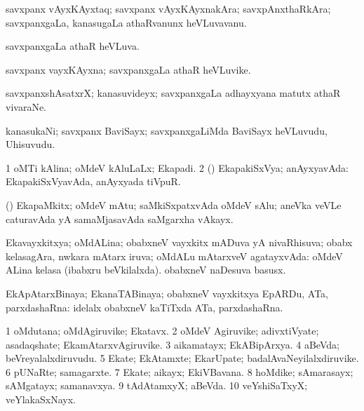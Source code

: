\bentry
{}
\gl{\gu}
\bmng
savxpanx vAyxKAyxtaq; savxpanx vAyxKAyxnakAra; savxpAnxthaRkAra; savxpanxgaLa, kanasugaLa athaRvanunx heVLuvavanu. 
\emng
\eentry

\bentry
{}
\gl{\gu}
\bmng
savxpanxgaLa athaR heVLuva. 
\emng
\eentry

\bentry
{}
\gl{\nA}
\bmng
savxpanx vayxKAyxna; savxpanxgaLa athaR heVLuvike. 
\emng
\eentry

\bentry
{}
\gl{\nA}
\bmng
savxpanxshAsatxrX; kanasuvideyx; savxpanxgaLa adhayxyana matutx athaR vivaraNe. 
\emng
\eentry

\bentry
{}
\gl{\nA}
\bmng
kanasukaNi; savxpanx BaviSayx; savxpanxgaLiMda BaviSayx heVLuvudu, Uhisuvudu. 
\emng
\eentry

\bentry
{}
\gl{\gu}
\bmng
\bnum
\num{1} oMTi kAlina; oMdeV kAluLaLx; Ekapadi. 
\num{2} (\rUpa) EkapakiSxVya; anAyxyavAda:  EkapakiSxVyavAda, anAyxyada tiVpuR. 
\enum
\emng
\eentry

\bentry
{}
\gl{\nA}
\bmng
(\AmA) EkapaMkitx; oMdeV mAtu; saMkiSxpatxvAda oMdeV sAlu; aneVka veVLe caturavAda yA samaMjasavAda saMgarxha vAkayx. 
\emng
\eentry

\bentry
{}
\gl{\gu}
\bmng
Ekavayxkitxya; oMdALina; obabxneV vayxkitx mADuva yA nivaRhisuva; obabx kelasagAra, nwkara mAtarx iruva; oMdALu mAtarxveV agatayxvAda:  oMdeV ALina kelasa (ibabxru beVkilalxda).  obabxneV naDesuva basusx. 
\emng

\noindent
\gl{\pagu}
\bmng
{} EkApAtarxBinaya; EkanaTABinaya; obabxneV vayxkitxya EpARDu, ATa, parxdashaRna:  idelalx obabxneV kaTiTxda ATa, parxdashaRna. 
\emng
\eentry

\bentry
{}
\gl{\nA}
\bmng
\bnum
\num{1} oMdutana; oMdAgiruvike; Ekatavx. 
\num{2} oMdeV Agiruvike; adivxtiVyate; asadaqshate; EkamAtarxvAgiruvike. 
\num{3} aikamatayx; EkABipArxya. 
\num{4} aBeVda; beVreyalalxdiruvudu. 
\num{5} Ekate; EkAtamxte; EkarUpate; badalAvaNeyilalxdiruvike. 
\num{6} pUNaRte; samagarxte. 
\num{7} Ekate; aikayx; EkiVBavana. 
\num{8} hoMdike; sAmarasayx; sAMgatayx; samanavxya. 
\num{9} tAdAtamxyX; aBeVda. 
\num{10} veYshiSaTxyX; veYlakaSxNayx. 
\enum
\emng
\eentry

